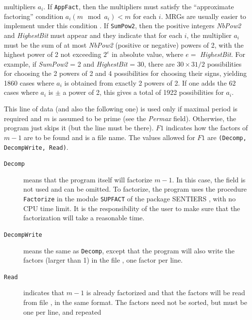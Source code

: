 \begin {description}
  multipliers $a_i$.
  If {\tt AppFact}, then the multipliers must satisfy the 
  ``approximate factoring'' condition $a_i (m\mod a_i) < m$ for each $i$.
  MRGs are usually easier to implement under this condition \cite{rLEC90a}.
  If {\tt SumPow2}, then the positive integers {\em NbPow2}
  and {\em HighestBit\/} must appear and they indicate that 
  for each $i$, the multiplier $a_i$ must be the sum of at most 
  {\em NbPow2} (positive or negative) powers of 2, 
  with the highest power of 2 not exceeding $2^e$ in absolute value,
  where $e =$ {\em HighestBit}.  
  For example, if {\em SumPow2\/} = 2 and {\em HighestBit\/} = 30,
  there are $30 \times 31 /2$ possibilities for choosing the 2 powers of 
  2 and 4 possibilities for choosing their signs, yielding
  1860 cases where $a_i$ is obtained from exactly 2 powers of 2.
  If one adds the $62$ cases where $a_i$ is $\pm$ a power of 2,
  this gives a total of 1922 possibilities for $a_i$.
%
\item [$F1$ and \<{\em file1}\> :]
  This line of data (and also the following one) is used only if 
  maximal period is required and $m$ is assumed to be prime
  (see the {\em Permax\/} field).  Otherwise, the program just skips it
  (but the line must be there).
  $F1$ indicates how the factors of $m-1$ are to be found and
  \> is a file name.
  The values allowed for $F1$ are {\tt (Decomp, DecompWrite, Read)}.
  \begin {description}
  \item  [{\tt Decomp}] means that the program itself will factorize
    $m-1$.  In this case, the field \> is not used and can be
    omitted.
    To factorize, the program uses the procedure
    {\tt Factorize} in the module {\tt SUPFACT} of the package SENTIERS
    \cite {iLEC88d}, with no CPU time limit.
    It is the responsibility of the user to make sure that the
    factorization will take a reasonable time.
  \item [{\tt DecompWrite}] means the same as {\tt Decomp}, except that
    the program will also write the factors (larger than 1) in the file
    \>, one factor per line.
  \item [{\tt Read}] indicates that $m-1$ is already factorized and that
    the factors will be read from file \>, in the same format.
    The factors need not be sorted, but must be one per line, and repeated

\end{description}
\end{description}
